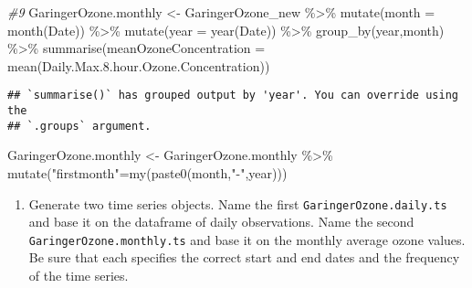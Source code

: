 \documentclass[
]{article}
\newenvironment{Shaded}{\begin{snugshade}}{\end{snugshade}}
\newcommand{\AttributeTok}[1]{\textcolor[rgb]{0.77,0.63,0.00}{#1}}
\newcommand{\CommentTok}[1]{\textcolor[rgb]{0.56,0.35,0.01}{\textit{#1}}}
\newcommand{\DecValTok}[1]{\textcolor[rgb]{0.00,0.00,0.81}{#1}}
\newcommand{\FloatTok}[1]{\textcolor[rgb]{0.00,0.00,0.81}{#1}}
\newcommand{\FunctionTok}[1]{\textcolor[rgb]{0.00,0.00,0.00}{#1}}
\newcommand{\NormalTok}[1]{#1}
\newcommand{\OtherTok}[1]{\textcolor[rgb]{0.56,0.35,0.01}{#1}}
\newcommand{\SpecialCharTok}[1]{\textcolor[rgb]{0.00,0.00,0.00}{#1}}
\newcommand{\StringTok}[1]{\textcolor[rgb]{0.31,0.60,0.02}{#1}}
\providecommand{\tightlist}{%
  \setlength{\itemsep}{0pt}\setlength{\parskip}{0pt}}
\begin{document}
\begin{Shaded}
\begin{Highlighting}[]
\CommentTok{\#9}
\NormalTok{GaringerOzone.monthly }\OtherTok{\textless{}{-}}
\NormalTok{GaringerOzone\_new }\SpecialCharTok{\%\textgreater{}\%}
\FunctionTok{mutate}\NormalTok{(}\AttributeTok{month =} \FunctionTok{month}\NormalTok{(Date)) }\SpecialCharTok{\%\textgreater{}\%} 
\FunctionTok{mutate}\NormalTok{(}\AttributeTok{year =} \FunctionTok{year}\NormalTok{(Date)) }\SpecialCharTok{\%\textgreater{}\%}
\FunctionTok{group\_by}\NormalTok{(year,month) }\SpecialCharTok{\%\textgreater{}\%}  
  \FunctionTok{summarise}\NormalTok{(}\AttributeTok{meanOzoneConcentration =} \FunctionTok{mean}\NormalTok{(Daily.Max.}\FloatTok{8.}\NormalTok{hour.Ozone.Concentration))}
\end{Highlighting}
\end{Shaded}

\begin{verbatim}
## `summarise()` has grouped output by 'year'. You can override using the
## `.groups` argument.
\end{verbatim}

\begin{Shaded}
\begin{Highlighting}[]
\NormalTok{GaringerOzone.monthly }\OtherTok{\textless{}{-}}
\NormalTok{GaringerOzone.monthly }\SpecialCharTok{\%\textgreater{}\%} \FunctionTok{mutate}\NormalTok{(}\StringTok{"firstmonth"}\OtherTok{=}\FunctionTok{my}\NormalTok{(}\FunctionTok{paste0}\NormalTok{(month,}\StringTok{"{-}"}\NormalTok{,year)))}
\end{Highlighting}
\end{Shaded}

\begin{enumerate}
\def\labelenumi{\arabic{enumi}.}
\setcounter{enumi}{9}
\tightlist
\item
  Generate two time series objects. Name the first
  \texttt{GaringerOzone.daily.ts} and base it on the dataframe of daily
  observations. Name the second \texttt{GaringerOzone.monthly.ts} and
  base it on the monthly average ozone values. Be sure that each
  specifies the correct start and end dates and the frequency of the
  time series.
\end{enumerate}

\begin{Shaded}
\end{Shaded}
\end{document}
